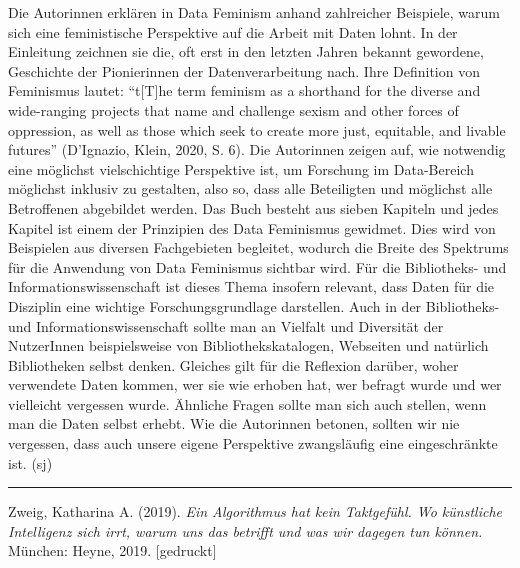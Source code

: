 \documentclass[a4paper,
fontsize=11pt,
oneside,
numbers=noperiodatend,
parskip=half-,
bibliography=totoc,
final
]{scrartcl}
\begin{document}
Die Autorinnen erklären in Data Feminism anhand zahlreicher Beispiele,
warum sich eine feministische Perspektive auf die Arbeit mit Daten
lohnt. In der Einleitung zeichnen sie die, oft erst in den letzten
Jahren bekannt gewordene, Geschichte der Pionierinnen der
Datenverarbeitung nach. Ihre Definition von Feminismus lautet:
\enquote{t{[}T{]}he term feminism as a shorthand for the diverse and
wide-ranging projects that name and challenge sexism and other forces of
oppression, as well as those which seek to create more just, equitable,
and livable futures} (D'Ignazio, Klein, 2020, S. 6). Die Autorinnen
zeigen auf, wie notwendig eine möglichst vielschichtige Perspektive ist,
um Forschung im Data-Bereich möglichst inklusiv zu gestalten, also so,
dass alle Beteiligten und möglichst alle Betroffenen abgebildet werden.
Das Buch besteht aus sieben Kapiteln und jedes Kapitel ist einem der
Prinzipien des Data Feminismus gewidmet. Dies wird von Beispielen aus
diversen Fachgebieten begleitet, wodurch die Breite des Spektrums für
die Anwendung von Data Feminismus sichtbar wird. Für die Bibliotheks-
und Informationswissenschaft ist dieses Thema insofern relevant, dass
Daten für die Disziplin eine wichtige Forschungsgrundlage darstellen.
Auch in der Bibliotheks- und Informationswissenschaft sollte man an
Vielfalt und Diversität der NutzerInnen beispielsweise von
Bibliothekskatalogen, Webseiten und natürlich Bibliotheken selbst
denken. Gleiches gilt für die Reflexion darüber, woher verwendete Daten
kommen, wer sie wie erhoben hat, wer befragt wurde und wer vielleicht
vergessen wurde. Ähnliche Fragen sollte man sich auch stellen, wenn man
die Daten selbst erhebt. Wie die Autorinnen betonen, sollten wir nie
vergessen, dass auch unsere eigene Perspektive zwangsläufig eine
eingeschränkte ist. (sj)

\begin{center}\rule{0.5\linewidth}{0.5pt}\end{center}

Zweig, Katharina A. (2019). \emph{Ein Algorithmus hat kein Taktgefühl.
Wo künstliche Intelligenz sich irrt, warum uns das betrifft und was wir
dagegen tun können.} München: Heyne, 2019. {[}gedruckt{]}
\end{document}
